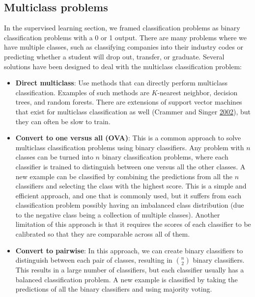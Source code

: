 \documentclass[]{krantz}
\begin{document}
\subsection{Multiclass problems}\label{multiclass-problems}

In the supervised learning section, we framed classification problems as
binary classification problems with a 0 or 1 output. There are many
problems where we have multiple classes, such as classifying companies
into their industry codes or predicting whether a student will drop out,
transfer, or graduate. Several solutions have been designed to deal with
the multiclass classification problem:

\begin{itemize}
\item
  \textbf{Direct multiclass}: Use methods that can directly perform
  multiclass classification. Examples of such methods are \(K\)-nearest
  neighbor, decision trees, and random forests. There are extensions of
  support vector machines that exist for multiclass classification as
  well (Crammer and Singer \protect\hyperlink{ref-crammer2002}{2002}),
  but they can often be slow to train.
\item
  \textbf{Convert to one versus all (OVA)}: This is a common approach to
  solve multiclass classification problems using binary classifiers. Any
  problem with \(n\) classes can be turned into \(n\) binary
  classification problems, where each classifier is trained to
  distinguish between one versus all the other classes. A new example
  can be classified by combining the predictions from all the \(n\)
  classifiers and selecting the class with the highest score. This is a
  simple and efficient approach, and one that is commonly used, but it
  suffers from each classification problem possibly having an imbalanced
  class distribution (due to the negative class being a collection of
  multiple classes). Another limitation of this approach is that it
  requires the scores of each classifier to be calibrated so that they
  are comparable across all of them.
\item
  \textbf{Convert to pairwise}: In this approach, we can create binary
  classifiers to distinguish between each pair of classes, resulting in
  \(\binom{n}{2}\) binary classifiers. This results in a large number of
  classifiers, but each classifier usually has a balanced classification
  problem. A new example is classified by taking the predictions of all
  the binary classifiers and using majority voting.
\end{itemize}
\end{document}
